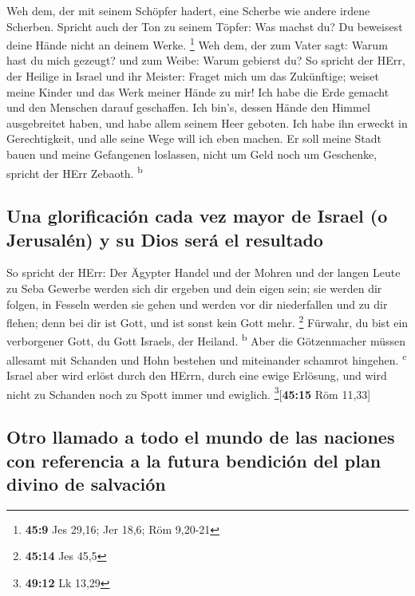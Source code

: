  Weh dem, der mit seinem Schöpfer hadert, eine Scherbe wie
andere irdene Scherben. Spricht auch der Ton zu seinem Töpfer: Was
machst du? Du beweisest deine Hände nicht an deinem Werke. \footnote{\textbf{45:9}
  Jes 29,16; Jer 18,6; Röm 9,20-21}  Weh dem, der zum
Vater sagt: Warum hast du mich gezeugt? und zum Weibe: Warum gebierst
du?  So spricht der HErr, der Heilige in Israel und ihr
Meister: Fraget mich um das Zukünftige; weiset meine Kinder und das Werk
meiner Hände zu mir!  Ich habe die Erde gemacht und den
Menschen darauf geschaffen. Ich bin's, dessen Hände den Himmel
ausgebreitet haben, und habe allem seinem Heer geboten. 
Ich habe ihn erweckt in Gerechtigkeit, und alle seine Wege will ich eben
machen. Er soll meine Stadt bauen und meine Gefangenen loslassen, nicht
um Geld noch um Geschenke, spricht der HErr Zebaoth. \textsuperscript{b}

\hypertarget{una-glorificaciuxf3n-cada-vez-mayor-de-israel-o-jerusaluxe9n-y-su-dios-seruxe1-el-resultado}{%
\subsection{Una glorificación cada vez mayor de Israel (o Jerusalén) y
su Dios será el
resultado}\label{una-glorificaciuxf3n-cada-vez-mayor-de-israel-o-jerusaluxe9n-y-su-dios-seruxe1-el-resultado}}

 So spricht der HErr: Der Ägypter Handel und der Mohren
und der langen Leute zu Seba Gewerbe werden sich dir ergeben und dein
eigen sein; sie werden dir folgen, in Fesseln werden sie gehen und
werden vor dir niederfallen und zu dir flehen; denn bei dir ist Gott,
und ist sonst kein Gott mehr. \footnote{\textbf{45:14} Jes 45,5}
 Fürwahr, du bist ein verborgener Gott, du Gott Israels,
der Heiland. \textsuperscript{b}  Aber die Götzenmacher
müssen allesamt mit Schanden und Hohn bestehen und miteinander schamrot
hingehen. \textsuperscript{c}  Israel aber wird erlöst
durch den HErrn, durch eine ewige Erlösung, und wird nicht zu Schanden
noch zu Spott immer und ewiglich. \footnote{\textbf{49:12} Lk 13,29}{[}\textbf{45:15}
Röm 11,33{]}

\hypertarget{otro-llamado-a-todo-el-mundo-de-las-naciones-con-referencia-a-la-futura-bendiciuxf3n-del-plan-divino-de-salvaciuxf3n}{%
\subsection{Otro llamado a todo el mundo de las naciones con referencia
a la futura bendición del plan divino de
salvación}\label{otro-llamado-a-todo-el-mundo-de-las-naciones-con-referencia-a-la-futura-bendiciuxf3n-del-plan-divino-de-salvaciuxf3n}}

